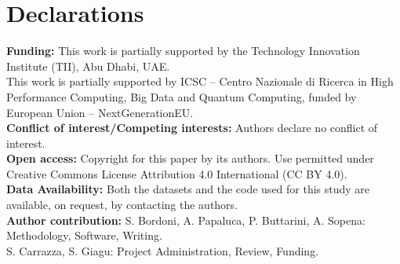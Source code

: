 \documentclass[referee,sn-basic]{sn-jnl} %
\begin{document}
\backmatter

\section*{Declarations}

\textbf{Funding:} 
This work is partially supported by the Technology Innovation Institute (TII), Abu Dhabi, UAE.\\
This work is partially supported by ICSC – Centro Nazionale di Ricerca in High Performance Computing, 
Big Data and Quantum Computing, funded by European Union – NextGenerationEU.\\

\noindent
\textbf{Conflict of interest/Competing interests:}
Authors declare no conflict of interest.\\

\noindent
\textbf{Open access:}
Copyright for this paper by its authors. Use permitted under Creative Commons License Attribution 4.0 International (CC BY 4.0).\\

\noindent
\textbf{Data Availability:} Both the datasets and the code used for this study are available, on request, by contacting
the authors.\\

\noindent
\textbf{Author contribution:} 
S. Bordoni, A. Papaluca, P. Buttarini, A. Sopena: Methodology, Software, Writing.\\
S. Carrazza, S. Giagu: Project Administration, Review, Funding.\\



\end{document}
